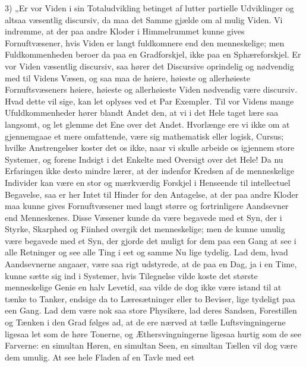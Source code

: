 \documentclass[11pt]{book}
\newcommand{\opage}[1]{\marginnote{\footnotesize\textit{[#1]}}}
\begin{document}
\opage{247} \setcounter{footnote}{0}%
3) „Er vor Viden i sin Totaludvikling betinget af lutter partielle
Udviklinger og altsaa væsentlig discursiv, da maa det Samme gjælde om
al mulig Viden. Vi indrømme, at der paa andre Kloder i Himmelrummet
kunne gives Fornuftvæsener, hvis Viden er langt fuldkomnere end den
menneskelige; men Fuldkommenheden beroer da paa en Gradforskjel, ikke
paa en Sphæreforskjel. Er vor Viden væsentlig discursiv, saa hører det
Discursive oprindelig og nødvendig med til Videns Væsen, og saa maa de
høiere, høieste og allerhøieste Fornuftsvæseners høiere, høieste og
allerhøieste Viden nødvendig være discursiv. Hvad dette vil sige, kan
let oplyses
\opage{248} \setcounter{footnote}{0}%
ved et Par Exempler. Til vor Videns mange Ufuldkommenheder hører
blandt Andet den, at vi i det Hele taget lære saa langsomt, og let
glemme det Ene over det Andet. Hvorlænge ere vi ikke om at gjennemgaae
et mere omfattende, være sig mathematisk eller logisk, Cursus; hvilke
Anstrengelser koster det os ikke, naar vi skulle arbeide os igjennem
store Systemer, og forene Indsigt i det Enkelte med Oversigt over det
Hele! Da nu Erfaringen ikke desto mindre lærer, at der indenfor
Kredsen af de menneskelige Individer kan være en stor og mærkværdig
Forskjel i Henseende til intellectuel Begavelse, saa er her Intet til
Hinder for den Antagelse, at der paa andre Kloder maa kunne gives
Fornuftvæsener med langt større og fortrinligere Aandsevner end
Menneskenes. Disse Væsener kunde da være begavede med et Syn, der i
Styrke, Skarphed og Fiinhed overgik det menneskelige; men de kunne
umulig være begavede med et Syn, der gjorde det muligt for dem paa een
Gang at see i alle Retninger og see alle Ting i eet og samme Nu lige
tydelig. Lad dem, hvad Aandsevnerne angaaer, være saa rigt udstyrede,
at de paa en Dag, ja i en Time, kunne sætte sig ind i Systemer, hvis
Tilegnelse vilde koste det største menneskelige Genie en halv Levetid,
saa vilde de dog ikke være istand til at tænke to Tanker, endsige da to
Læresætninger eller to Beviser, lige tydeligt paa een Gang. Lad dem
være nok saa store Physikere, lad deres Sandsen, Forestillen og Tænken
i den Grad følges ad, at de ere nærved at tælle Luftsvingningerne
ligesaa let som de høre Tonerne, og Æthersvingningerne ligesaa hurtig
som de see Farverne: en simultan Høren, en simultan Seen, en simultan
Tællen vil dog være dem umulig. At see hele Fladen af en Tavle med eet
\end{document}
